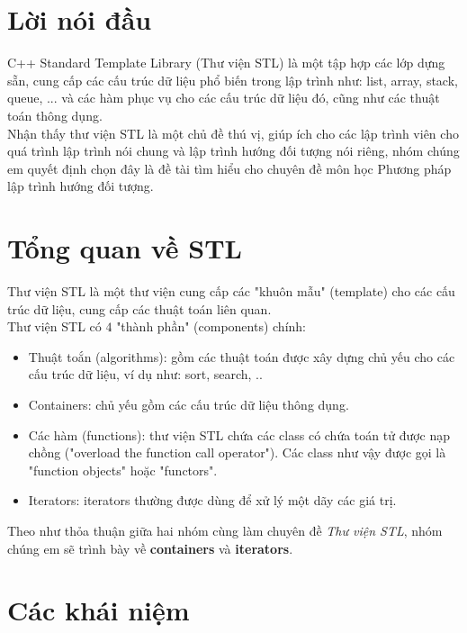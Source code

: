 \section*{Lời nói đầu}
C++ Standard Template Library (Thư viện STL) là một tập hợp các lớp dựng sẵn, cung cấp các cấu trúc dữ liệu phổ biến trong lập trình như: list, array, stack, queue, ... và các hàm phục vụ cho các cấu trúc dữ liệu đó, cũng như các thuật toán thông dụng.\\
Nhận thấy thư viện STL là một chủ đề thú vị, giúp ích cho các lập trình viên cho quá trình lập trình nói chung và lập trình hướng đối tượng nói riêng, nhóm chúng em quyết định chọn đây là đề tài tìm hiểu cho chuyên đề môn học Phương pháp lập trình hướng đối tượng.\\

\newpage
\tableofcontents
\listoffigures

\newpage
\section{Tổng quan về STL}
Thư viện STL là một thư viện cung cấp các "khuôn mẫu" (template) cho các cấu trúc dữ liệu, cung cấp các thuật toán liên quan.\\
Thư viện STL có $4$ "thành phần" (components) chính: \cite{general}
\begin{itemize}
    \item Thuật toắn (algorithms): gồm các thuật toán được xây dựng chủ yếu cho các cấu trúc dữ liệu, ví dụ như: sort, search, ..
    \item Containers: chủ yếu gồm các cấu trúc dữ liệu thông dụng.
    \item Các hàm (functions): thư viện STL chứa các class có chứa toán tử được nạp chồng ("overload the function call operator"). Các class như vậy được gọi là "function objects" hoặc "functors".
    \item Iterators: iterators thường được dùng để xử lý một dãy các giá trị.
\end{itemize}
Theo như thỏa thuận giữa hai nhóm cùng làm chuyên đề \textit{Thư viện STL}, nhóm chúng em sẽ trình bày về \textbf{containers} và \textbf{iterators}.

\section{Các khái niệm}
